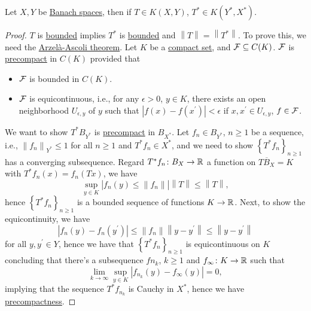\begin{theorem}[Schauder]\label{thm:Schauder}
	Let \(X, Y\) be \hyperref[def:Banach-space]{Banach spaces}, then if \(T\in K(X, Y)\), \(T^{\ast} \in K(Y^{\ast} , X^{\ast} )\).
\end{theorem}
\begin{proof}
	\(T\) is \hyperref[def:bounded-map]{bounded} implies \(T^{\ast} \) is \hyperref[def:bounded-map]{bounded} and \(\left\lVert T\right\rVert = \left\lVert T^{\ast} \right\rVert \). To prove this, we need the \href{https://en.wikipedia.org/wiki/Arzel%C3%A0%E2%80%93Ascoli_theorem}{Arzelà-Ascoli theorem}. Let \(K\) be a \hyperref[def:compact]{compact set}, and \(\mathcal{\MakeUppercase{f}} \subseteq C(K)\). \(\mathcal{\MakeUppercase{f}} \) is \hyperref[def:precompact]{precompact} in \(C(K)\) provided that 
	\begin{itemize}
		\item \(\mathcal{\MakeUppercase{f}} \) is bounded in \(C(K)\).
		\item \(\mathcal{\MakeUppercase{f}} \) is equicontinuous, i.e., for any \(\epsilon >0\), \(y\in K\), there exists an open neighborhood \(U_{\epsilon , y}\) of \(y\) such that \(\left\vert f(x) - f(x^\prime ) \right\vert< \epsilon \) if \(x, x^\prime \in U_{\epsilon , y}\), \(f\in \mathcal{\MakeUppercase{f}} \).
	\end{itemize}
	We want to show \(T^{\ast} B_{Y^{\ast} }\) is \hyperref[def:precompact]{precompact} in \(B_{X^{\ast} }\). Let \(f_{n} \in B_{Y^{\ast} }\), \(n \geq 1\) be a sequence, i.e., \(\left\lVert f_n \right\rVert _{Y^{\ast} } \leq 1\) for all \(n\geq 1\) and \(T^{\ast} f_{n} \in X^{\ast} \), and we need to show \(\left\{ T^{\ast} f_n \right\}_{n\geq 1} \) has a converging subsequence. Regard \(T^{\ast} f_{n} \colon B_X \to \mathbb{\MakeUppercase{r}} \) a function on \(\overline{TB_{X} } = K\) with \(T^{\ast} f_{n} (x) = f_{n} (Tx)\), we have
	\[
		\sup _{y\in K} \left\vert f_{n} (y)\leq \left\lVert f_{n} \right\rVert  \right\vert \left\lVert T\right\rVert \leq \left\lVert T\right\rVert,
	\]
	hence \(\left\{ T^{\ast} f_{n}  \right\}_{n\geq 1} \) is a bounded sequence of functions \(K\to \mathbb{\MakeUppercase{r}} \). Next, to show the equicontinuity, we have
	\[
		\left\vert f_{n} (y) - f_{n} (y^\prime ) \right\vert
		\leq \left\lVert f_{n} \right\rVert \left\lVert y-y^\prime \right\rVert
		\leq \left\lVert y - y^\prime \right\rVert
	\]
	for all \(y, y^\prime \in Y\), hence we have that \(\left\{ T^{\ast} f_{n}  \right\}_{n\geq 1} \) is equicontinuous on \(K\) concluding that there's a subsequence \(f{n_{k} }\), \(k \geq 1\) and \(f_{\infty }\colon K\to \mathbb{\MakeUppercase{r}} \) such that
	\[
		\lim_{k \to \infty} \sup _{y\in K}\left\vert f_{n_{k} } (y) - f_\infty (y) \right\vert = 0 ,
	\]
	implying that the sequence \(T^{\ast} f_{n_{k} }\) is Cauchy in \(X^{\ast} \), hence we have \hyperref[def:precompact]{precompactness}.
\end{proof}